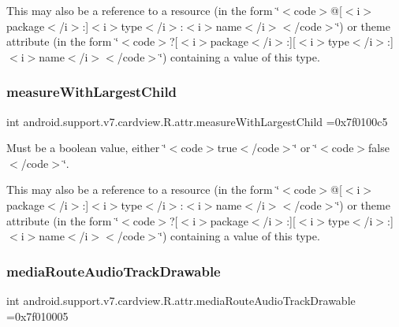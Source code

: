 This may also be a reference to a resource (in the form \char`\"{}$<$code$>$@\mbox{[}$<$i$>$package$<$/i$>$\+:\mbox{]}$<$i$>$type$<$/i$>$\+:$<$i$>$name$<$/i$>$$<$/code$>$\char`\"{}) or theme attribute (in the form \char`\"{}$<$code$>$?\mbox{[}$<$i$>$package$<$/i$>$\+:\mbox{]}\mbox{[}$<$i$>$type$<$/i$>$\+:\mbox{]}$<$i$>$name$<$/i$>$$<$/code$>$\char`\"{}) containing a value of this type. \mbox{\label{classandroid_1_1support_1_1v7_1_1cardview_1_1R_1_1attr_a310436bd0218ec6341dca4db85bbf509}} 
\subsubsection{\texorpdfstring{measure\+With\+Largest\+Child}{measureWithLargestChild}}
{\footnotesize\ttfamily int android.\+support.\+v7.\+cardview.\+R.\+attr.\+measure\+With\+Largest\+Child =0x7f0100c5\hspace{0.3cm}{\ttfamily [static]}}

Must be a boolean value, either \char`\"{}$<$code$>$true$<$/code$>$\char`\"{} or \char`\"{}$<$code$>$false$<$/code$>$\char`\"{}. 

This may also be a reference to a resource (in the form \char`\"{}$<$code$>$@\mbox{[}$<$i$>$package$<$/i$>$\+:\mbox{]}$<$i$>$type$<$/i$>$\+:$<$i$>$name$<$/i$>$$<$/code$>$\char`\"{}) or theme attribute (in the form \char`\"{}$<$code$>$?\mbox{[}$<$i$>$package$<$/i$>$\+:\mbox{]}\mbox{[}$<$i$>$type$<$/i$>$\+:\mbox{]}$<$i$>$name$<$/i$>$$<$/code$>$\char`\"{}) containing a value of this type. \mbox{\label{classandroid_1_1support_1_1v7_1_1cardview_1_1R_1_1attr_a6dc9dcb137551ffff0f4154a3d9c4a0e}} 
\subsubsection{\texorpdfstring{media\+Route\+Audio\+Track\+Drawable}{mediaRouteAudioTrackDrawable}}
{\footnotesize\ttfamily int android.\+support.\+v7.\+cardview.\+R.\+attr.\+media\+Route\+Audio\+Track\+Drawable =0x7f010005\hspace{0.3cm}{\ttfamily [static]}}

